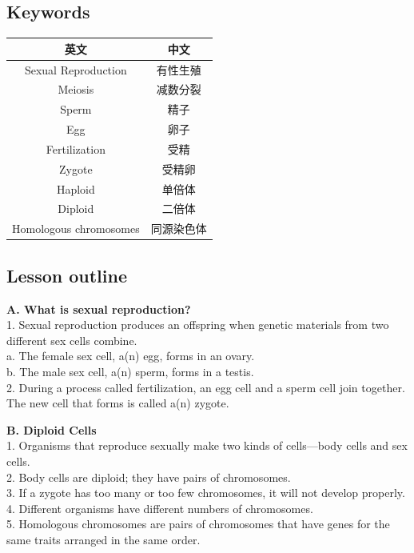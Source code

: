 \documentclass[
]{book}
\begin{document}
\hypertarget{keywords}{%
\subsection{Keywords}\label{keywords}}

\begin{longtable}[]{@{}cc@{}}
\toprule\noalign{}
英文 & 中文 \\
\midrule\noalign{}
\endhead
\bottomrule\noalign{}
\endlastfoot
Sexual Reproduction & 有性生殖 \\
Meiosis & 减数分裂 \\
Sperm & 精子 \\
Egg & 卵子 \\
Fertilization & 受精 \\
Zygote & 受精卵 \\
Haploid & 单倍体 \\
Diploid & 二倍体 \\
Homologous chromosomes & 同源染色体 \\
\end{longtable}

\hypertarget{lesson-outline}{%
\subsection{Lesson outline}\label{lesson-outline}}

\textbf{A. What is sexual reproduction?}\\
1. {Sexual reproduction} produces an offspring when genetic materials from two
different sex cells combine.\\
a. The female sex cell, a(n) {egg}, forms in an ovary.\\
b. The male sex cell, a(n) {sperm}, forms in a testis.\\
2. During a process called {fertilization}, an egg cell and a sperm cell join together. The
new cell that forms is called a(n) {zygote}.

\textbf{B. Diploid Cells}\\
1. Organisms that reproduce sexually make two kinds of cells---{body} cells and sex cells.\\
2. Body cells are {diploid}; they have pairs of chromosomes.\\
3. If a zygote has too many or too few {chromosomes}, it will not develop properly.\\
4. Different organisms have different {numbers} of chromosomes.\\
5. {Homologous chromosomes} are pairs of chromosomes that have genes for the same traits arranged in the same order.
\end{document}
